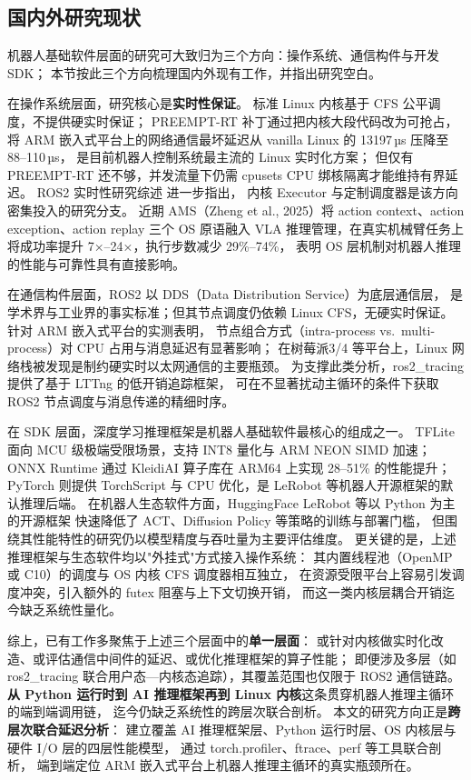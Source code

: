 \subsection{国内外研究现状}\label{sec:related-work}

机器人基础软件层面的研究可大致归为三个方向：操作系统、通信构件与开发 SDK；
本节按此三个方向梳理国内外现有工作，并指出研究空白。

在操作系统层面，研究核心是\textbf{实时性保证}。
标准 Linux 内核基于 CFS 公平调度，不提供硬实时保证；
PREEMPT-RT 补丁通过把内核大段代码改为可抢占，
将 ARM 嵌入式平台上的网络通信最坏延迟从 vanilla Linux 的 13197\,µs 压降至 88–110\,µs\cite{rtlinux}，
是目前机器人控制系统最主流的 Linux 实时化方案；
但仅有 PREEMPT-RT 还不够，并发流量下仍需 cpusets CPU 绑核隔离才能维持有界延迟\cite{rtlinux}。
ROS2 实时性研究综述\cite{ros2rtsurvey} 进一步指出，
内核 Executor 与定制调度器是该方向密集投入的研究分支。
近期 AMS\cite{ams}（Zheng et al., 2025）将 action context、action exception、action replay
三个 OS 原语融入 VLA 推理管理，在真实机械臂任务上将成功率提升 7×–24×，执行步数减少 29\%–74\%，
表明 OS 层机制对机器人推理的性能与可靠性具有直接影响。

在通信构件层面，ROS2\cite{ros2} 以 DDS（Data Distribution Service）为底层通信层，
是学术界与工业界的事实标准；但其节点调度仍依赖 Linux CFS，无硬实时保证。
针对 ARM 嵌入式平台的实测表明，
节点组合方式（intra-process vs.\ multi-process）对 CPU 占用与消息延迟有显著影响\cite{ros2composition}；
在树莓派3/4 等平台上，Linux 网络栈被发现是制约硬实时以太网通信的主要瓶颈\cite{ros2ddsrpi}。
为支撑此类分析，ros2\_tracing\cite{ros2tracing} 提供了基于 LTTng 的低开销追踪框架，
可在不显著扰动主循环的条件下获取 ROS2 节点调度与消息传递的精细时序。

在 SDK 层面，深度学习推理框架是机器人基础软件最核心的组成之一。
TFLite\cite{tflite} 面向 MCU 级极端受限场景，支持 INT8 量化与 ARM NEON SIMD 加速；
ONNX Runtime\cite{onnxruntime} 通过 KleidiAI 算子库在 ARM64 上实现 28–51\% 的性能提升；
PyTorch 则提供 TorchScript 与 CPU 优化，是 LeRobot\cite{lerobot} 等机器人开源框架的默认推理后端。
在机器人生态软件方面，HuggingFace LeRobot 等以 Python 为主的开源框架
快速降低了 ACT\cite{act}、Diffusion Policy\cite{diffusionpolicy} 等策略的训练与部署门槛，
但围绕其性能特性的研究仍以模型精度与吞吐量为主要评估维度。
更关键的是，上述推理框架与生态软件均以"外挂式"方式接入操作系统：
其内置线程池（OpenMP 或 C10）的调度与 OS 内核 CFS 调度器相互独立，
在资源受限平台上容易引发调度冲突，引入额外的 futex 阻塞与上下文切换开销，
而这一类内核层耦合开销迄今缺乏系统性量化。

综上，已有工作多聚焦于上述三个层面中的\textbf{单一层面}：
或针对内核做实时化改造、或评估通信中间件的延迟、或优化推理框架的算子性能；
即便涉及多层（如 ros2\_tracing 联合用户态—内核态追踪），其覆盖范围也仅限于 ROS2 通信链路。
\textbf{从 Python 运行时到 AI 推理框架再到 Linux 内核}这条贯穿机器人推理主循环的端到端调用链，
迄今仍缺乏系统性的跨层次联合剖析。
本文的研究方向正是\textbf{跨层次联合延迟分析}：
建立覆盖 AI 推理框架层、Python 运行时层、OS 内核层与硬件 I/O 层的四层性能模型，
通过 torch.profiler、ftrace、perf 等工具联合剖析，
端到端定位 ARM 嵌入式平台上机器人推理主循环的真实瓶颈所在。
